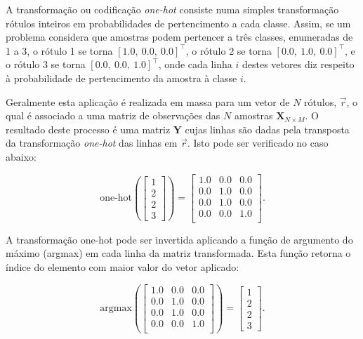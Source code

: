  \label{a:one_hot}

  A transformação ou codificação \textit{one-hot} consiste numa simples transformação rótulos inteiros em probabilidades de pertencimento a cada classe. Assim, se um problema considera que amostras podem pertencer a três classes, enumeradas de 1 a 3, o rótulo 1 se torna $[1.0,\ 0.0,\ 0.0]^\top$, o rótulo 2 se torna $[0.0,\ 1.0,\ 0.0]^\top$, e o rótulo 3 se torna $[0.0,\ 0.0,\ 1.0]^\top$, onde cada linha $i$ destes vetores diz respeito à probabilidade de pertencimento da amostra à classe $i$.

  Geralmente esta aplicação é realizada em massa para um vetor de $N$ rótulos, $\vec{r}$, o qual é associado a uma matriz de observações das $N$ amostras $\boldsymbol{X}_{N\times M}$. O resultado deste processo é uma matriz $\boldsymbol{Y}$ cujas linhas são dadas pela transposta da transformação \textit{one-hot} das linhas em $\vec{r}$. Isto pode ser verificado no caso abaixo:

  \begin{equation}
    \text{one-hot} \left(
    \begin{bmatrix}
      1 \\
      2 \\
      2 \\
      3
    \end{bmatrix} \right)
    =
    \begin{bmatrix}
      1.0 & 0.0 & 0.0 \\
      0.0 & 1.0 & 0.0 \\
      0.0 & 1.0 & 0.0 \\
      0.0 & 0.0 & 1.0 \\
    \end{bmatrix}
    .
  \end{equation}

  A transformação one-hot pode ser invertida aplicando a função de argumento do máximo (argmax) em cada linha da matriz transformada. Esta função retorna o índice do elemento com maior valor do vetor aplicado:

  \begin{equation}
    \text{argmax} \left(
    \begin{bmatrix}
      1.0 & 0.0 & 0.0 \\
      0.0 & 1.0 & 0.0 \\
      0.0 & 1.0 & 0.0 \\
      0.0 & 0.0 & 1.0 \\
    \end{bmatrix} \right)
    =
    \begin{bmatrix}
      1 \\
      2 \\
      2 \\
      3
    \end{bmatrix}
    .
  \end{equation}

